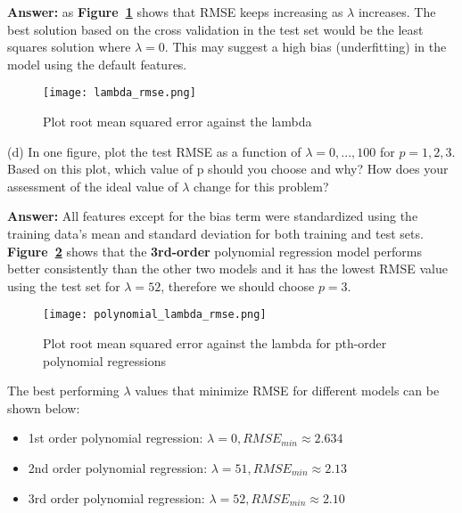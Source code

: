\documentclass[11pt]{report}
\begin{document}
\justify
\textbf{Answer:} as \textbf{Figure~\ref{fig:ambda_rmse}} shows that RMSE keeps increasing as $\lambda$ increases. The best solution based on the cross validation in the test set would be the least squares solution where $\lambda = 0$. This may suggest a high bias (underfitting) in the model using the default features. 


\begin{figure}[h]
\texttt{[image: lambda\_rmse.png]}
\centering
\caption{Plot root mean squared error against the lambda}
\label{fig:ambda_rmse}
\end{figure}


\justify
(d) In one figure, plot the test RMSE as a function of $\lambda = 0, . . . , 100$ for $ p = 1,  2, 3$. Based on this plot, which value of p should you choose and why? How does your assessment of the ideal value of $\lambda$ change for this problem?

\justify
\textbf{Answer:} All features except for the bias term were standardized using the training data's mean and standard deviation for both training and test sets. \textbf{Figure~\ref{fig:polynomial_lambda_rmse}} shows that the \textbf{3rd-order} polynomial regression model performs better consistently than the other two models and it has the lowest RMSE value using the test set for $\lambda = 52$, therefore we should choose $p=3$.  

\begin{figure}[h]
\texttt{[image: polynomial\_lambda\_rmse.png]}
\centering
\caption{Plot root mean squared error against the lambda for pth-order polynomial regressions}
\label{fig:polynomial_lambda_rmse}
\end{figure}

\justify
The best performing $\lambda$ values that minimize RMSE for different models can be shown below:
\begin{itemize}
	\item 1st order polynomial regression: $\lambda = 0, RMSE_{min} \approx 2.634$
	\item 2nd order polynomial regression: $\lambda = 51, RMSE_{min} \approx 2.13$
	\item 3rd order polynomial regression: $\lambda = 52, RMSE_{min} \approx 2.10$
\end{itemize} 
\end{document}
